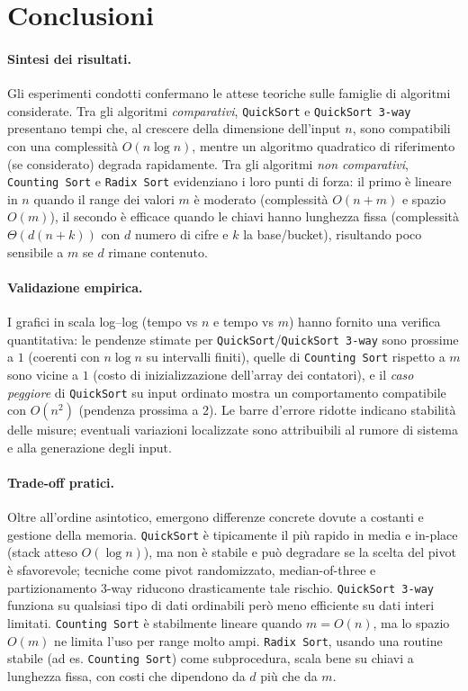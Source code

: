 \documentclass[a4paper, 11pt]{article}
\begin{document}
\section{Conclusioni}

\paragraph{Sintesi dei risultati.}
Gli esperimenti condotti confermano le attese teoriche sulle famiglie di algoritmi considerate. 
Tra gli algoritmi \emph{comparativi}, \texttt{QuickSort} e \texttt{QuickSort 3-way} presentano tempi che, al crescere della dimensione dell'input \(n\), sono compatibili con una complessità \(O(n\log n)\), mentre un algoritmo quadratico di riferimento (se considerato) degrada rapidamente. 
Tra gli algoritmi \emph{non comparativi}, \texttt{Counting Sort} e \texttt{Radix Sort} evidenziano i loro punti di forza: il primo è lineare in \(n\) quando il range dei valori \(m\) è moderato (complessità \(O(n+m)\) e spazio \(O(m)\)), il secondo è efficace quando le chiavi hanno lunghezza fissa (complessità \(\Theta(d(n+k))\) con \(d\) numero di cifre e \(k\) la base/bucket), risultando poco sensibile a \(m\) se \(d\) rimane contenuto.

\paragraph{Validazione empirica.}
I grafici in scala log--log (tempo vs \(n\) e tempo vs \(m\)) hanno fornito una verifica quantitativa: 
le pendenze stimate per \texttt{QuickSort}/\texttt{QuickSort 3-way} sono prossime a \(1\) (coerenti con \(n\log n\) su intervalli finiti), 
quelle di \texttt{Counting Sort} rispetto a \(m\) sono vicine a \(1\) (costo di inizializzazione dell'array dei contatori), 
e il \emph{caso peggiore} di \texttt{QuickSort} su input ordinato mostra un comportamento compatibile con \(O(n^2)\) (pendenza prossima a \(2\)). 
Le barre d'errore ridotte indicano stabilità delle misure; eventuali variazioni localizzate sono attribuibili al rumore di sistema e alla generazione degli input.

\paragraph{Trade-off pratici.}
Oltre all'ordine asintotico, emergono differenze concrete dovute a costanti e gestione della memoria. 
\texttt{QuickSort} è tipicamente il più rapido in media e in-place (stack atteso \(O(\log n)\)), ma non è stabile e può degradare se la scelta del pivot è sfavorevole; tecniche come pivot randomizzato, median-of-three e partizionamento 3-way riducono drasticamente tale rischio. 
\texttt{QuickSort 3-way} funziona su qualsiasi tipo di dati ordinabili però meno efficiente su dati interi limitati. 
\texttt{Counting Sort} è stabilmente lineare quando \(m=O(n)\), ma lo spazio \(O(m)\) ne limita l'uso per range molto ampi. 
\texttt{Radix Sort}, usando una routine stabile (ad es. \texttt{Counting Sort}) come subprocedura, scala bene su chiavi a lunghezza fissa, con costi che dipendono da \(d\) più che da \(m\).
\end{document}

